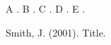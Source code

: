\documentclass{article}
\begin{document}
A \cite{a}. B \cite[p.~5]{a}. C \citep{a}. D \citet{a}. E \citep[e.g.][]{a}.
\begin{thebibliography}{}
 Smith, J. (2001). Title.
\end{thebibliography}
\end{document}
